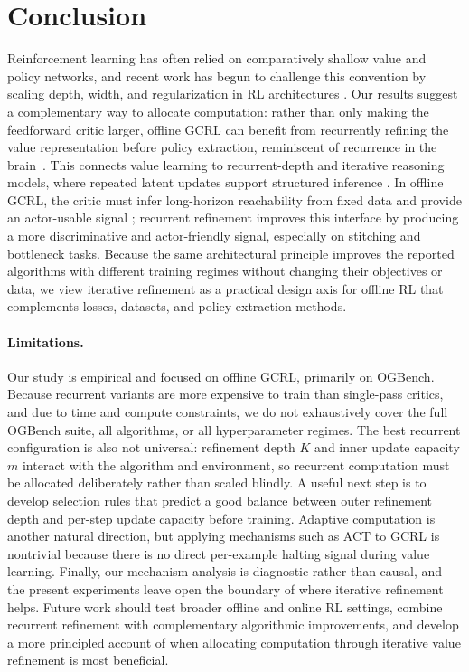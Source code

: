 \documentclass{article}
\begin{document}
\section{Conclusion}
Reinforcement learning has often relied on comparatively shallow value and policy networks, and recent work has begun to challenge this convention by scaling depth, width, and regularization in RL architectures \citep{thousand_layers, bro, simba}. Our results suggest a complementary way to allocate computation: rather than only making the feedforward critic larger, offline GCRL can benefit from recurrently refining the value representation before policy extraction, reminiscent of recurrence in the brain~\citep{kietzmann2019cortical}. This connects value learning to recurrent-depth and iterative reasoning models, where repeated latent updates support structured inference \citep{universal_transformer, deq, recurrent_relational_networks, energy_diffusion, hrm, trm, urm}. In offline GCRL, the critic must infer long-horizon reachability from fixed data and provide an actor-usable signal \citep{ogbench, value_bottleneck}; recurrent refinement improves this interface by producing a more discriminative and actor-friendly signal, especially on stitching and bottleneck tasks. Because the same architectural principle improves the reported algorithms with different training regimes without changing their objectives or data, we view iterative refinement as a practical design axis for offline RL that complements losses, datasets, and policy-extraction methods.


\paragraph{Limitations.}\label{limitation}
Our study is empirical and focused on offline GCRL, primarily on OGBench. Because recurrent variants are more expensive to train than single-pass critics, and due to time and compute constraints, we do not exhaustively cover the full OGBench suite, all algorithms, or all hyperparameter regimes. The best recurrent configuration is also not universal: refinement depth $K$ and inner update capacity $m$ interact with the algorithm and environment, so recurrent computation must be allocated deliberately rather than scaled blindly. A useful next step is to develop selection rules that predict a good balance between outer refinement depth and per-step update capacity before training. Adaptive computation is another natural direction, but applying mechanisms such as ACT \citep{act} to GCRL is nontrivial because there is no direct per-example halting signal during value learning. Finally, our mechanism analysis is diagnostic rather than causal, and the present experiments leave open the boundary of where iterative refinement helps. Future work should test broader offline and online RL settings, combine recurrent refinement with complementary algorithmic improvements, and develop a more principled account of when allocating computation through iterative value refinement is most beneficial.
\end{document}
